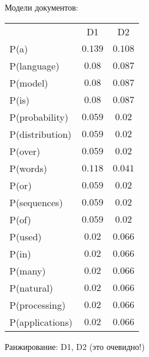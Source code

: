 \begin{solution}
\begin{center}
\end{center}
Модели документов:
\begin{center}
	\begin{tabular}{lcc}
			& D1 & D2 \\
		P(a) & $0.139$ & $0.108$ \\
		P(language) & $0.08$ & $0.087$ \\
		P(model) & $0.08$ & $0.087$ \\
		P(is) & $0.08$ & $0.087$ \\
		P(probability) & $0.059$ & $0.02$ \\
		P(distribution) & $0.059$ & $0.02$ \\
		P(over) & $0.059$ & $0.02$ \\
		P(words) & $0.118$ & $0.041$ \\
		P(or) & $0.059$ & $0.02$ \\
		P(sequences) & $0.059$ & $0.02$ \\
		P(of) & $0.059$ & $0.02$ \\
		P(used) & $0.02$ & $0.066$ \\
		P(in) & $0.02$ & $0.066$ \\
		P(many) & $0.02$ & $0.066$ \\
		P(natural) & $0.02$ & $0.066$ \\
		P(processing) & $0.02$ & $0.066$ \\
		P(applications) & $0.02$ & $0.066$
	\end{tabular}
\end{center}

Ранжирование: D1, D2 (это очевидно!)
\end{solution}

